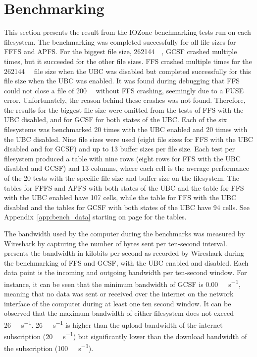 \section{Benchmarking}
\label{sec:res_bench}
This section presents the result from the IOZone benchmarking tests run on each filesystem. The benchmarking was completed successfully for all file sizes for \gls{FFFS} and \gls{APFS}. For the biggest file size, \SI{262144}{\kilo\byte}, \gls{GCSF} crashed multiple times, but it succeeded for the other file sizes. \gls{FFS} crashed multiple times for the \SI{262144}{\kilo\byte} file size when the \gls{UBC} was disabled but completed successfully for this file size when the \gls{UBC} was enabled. It was found during debugging that \gls{FFS} could not close a file of \SI{200}{\mega\byte} without \gls{FFS} crashing, seemingly due to a \gls{FUSE} error. Unfortunately, the reason behind these crashes was not found. Therefore, the results for the biggest file size were omitted from the tests of \gls{FFS} with the \gls{UBC} disabled, and for \gls{GCSF} for both states of the \gls{UBC}. Each of the six filesystems was benchmarked 20 times with the \gls{UBC} enabled and 20 times with the \gls{UBC} disabled. Nine file sizes were used (eight file sizes for \gls{FFS} with the \gls{UBC} disabled and for \gls{GCSF}) and up to 13 buffer sizes per file size. Each test per filesystem produced a table with nine rows (eight rows for \gls{FFS} with the \gls{UBC} disabled and \gls{GCSF}) and 13 columns, where each cell is the average performance of the 20 tests with the specific file size and buffer size on the filesystem. The tables for \gls{FFFS} and \gls{APFS} with both states of the \gls{UBC} and the table for \gls{FFS} with the \gls{UBC} enabled have 107 cells, while the table for \gls{FFS} with the \gls{UBC} disabled and the tables for \gls{GCSF} with both states of the \gls{UBC} have 94 cells. See Appendix~\ref{app:bench_data} starting on page \pageref{app:bench_data} for the tables.

The bandwidth used by the computer during the benchmarks was measured by Wireshark by capturing the number of bytes sent per ten-second interval.  presents the bandwidth in kilobits per second as recorded by Wireshark during the benchmarking of \gls{FFS} and \gls{GCSF}, with the \gls{UBC} enabled and disabled. Each data point is the incoming and outgoing bandwidth per ten-second window. For instance, it can be seen that the minimum bandwidth of \gls{GCSF} is \SI[per-mode = symbol]{0.00}{\kilo\byte\per\second}, meaning that no data was sent or received over the internet on the network interface of the computer during at least one ten second window. It can be observed that the maximum bandwidth of either filesystem does not exceed \SI[per-mode = symbol]{26}{\mega\bit\per\second}. \SI[per-mode = symbol]{26}{\mega\bit\per\second} is higher than the upload bandwidth of the internet subscription (\SI[per-mode = symbol]{20}{\mega\bit\per\second}) but significantly lower than the download bandwidth of the subscription (\SI[per-mode = symbol]{100}{\mega\bit\per\second}).

